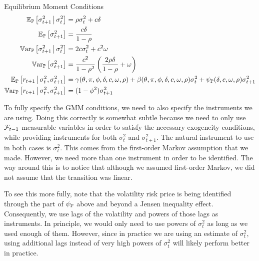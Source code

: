 \documentclass[11pt, letterpaper, twoside, final]{article}
\begin{document}
\begin{defn}{Equilibrium Moment Conditions}
    \label{defn:equilibrium_moment_conditions}
    \begin{align}
        \label{eqn:cond_vol_mean}
        \E_{\PP}\left[\sigma^2_{t+1} \mvert \sigma^2_t \right]  &= \rho \sigma^2_t  + c \delta\\
%
        \label{eqn:global_vol_mean}
        \E_{\PP}\left[\sigma^2_{t+1}\right]  &= \frac{c \delta}{1 - \rho} \\
%
        \label{eqn:cond_vol_var}
        \Var_{\PP}\left[\sigma^2_{t+1} \mvert \sigma^2_t \right]  &=  2 c \sigma^2_t  + c^2 \omega \\
%
        \label{eqn:global_vol_var}
        \Var_{\PP}\left[\sigma^2_{t+1} \right]  &=  \frac{c^2}{1 - \rho^2}  \left(\frac{2 \rho \delta}{1 - \rho}  +
        \omega \right)  \\
%
        \label{eqn:cond_expected_rtn_moment}
        \E_{\PP}\left[r_{t+1} \mvert \sigma^2_t, \sigma^2_{t+1}\right] &= \gamma(\theta, \pi, \phi, \delta, c,
        \omega, \rho) + \beta(\theta, \pi, \phi, \delta, c, \omega, \rho) \sigma^2_t + \psi_{\PP}(\delta, c, \omega,
        \rho) \sigma^2_{t+1} \\
%
        \label{eqn:cond_rtn_var}
        \Var_{\PP}\left[r_{t+1} \mvert \sigma^2_t, \sigma^2_{t+1}\right] &= (1 - \phi^2) \sigma^2_{t+1} 
\end{align}
\end{defn}

To fully specify the GMM conditions, we need to also specify the instruments we are using.
Doing this correctly is somewhat subtle because we need to only use $\mathcal{F}_{t-1}$-measurable variables in order to
satisfy the necessary exogeneity conditions, while providing instruments for both $\sigma^2_t$ and
$\sigma^2_{t+1}$. 
The natural instrument to use in both cases is $\sigma^2_t$.
This comes from the first-order Markov assumption that we made.
However, we need more than one instrument in order to be identified.
The way around this is to notice that although we assumed first-order Markov, we did not assume that the
transition was linear. 

To see this more fully, note that the volatility risk price is being identified through the part of $\psi_{\mathbb{P}}$
above and beyond a Jensen inequality effect.
Consequently, we use lags of the volatility and powers of those lags as instruments.
In principle, we would only need to use powers of $\sigma^2_t$ as long as we used enough of them.
However, since in practice we are using an estimate of $\sigma^2_t$, using additional lags instead of very high
powers of $\sigma^2_t$ will likely perform better in practice.
\end{document}
